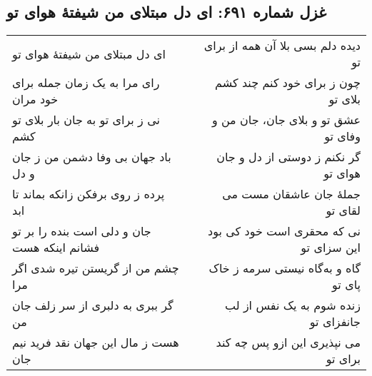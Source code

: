 \begin{center}
\section*{غزل شماره ۶۹۱: ای دل مبتلای من شیفتهٔ هوای تو}
\label{sec:691}
\begin{longtable}{l p{0.5cm} r}
ای دل مبتلای من شیفتهٔ هوای تو
&&
دیده دلم بسی بلا آن همه از برای تو
\\
رای مرا به یک زمان جمله برای خود مران
&&
چون ز برای خود کنم چند کشم بلای تو
\\
نی ز برای تو به جان بار بلای تو کشم
&&
عشق تو و بلای جان، جان من و وفای تو
\\
باد جهان بی وفا دشمن من ز جان و دل
&&
گر نکنم ز دوستی از دل و جان هوای تو
\\
پرده ز روی برفکن زانکه بماند تا ابد
&&
جملهٔ جان عاشقان مست می لقای تو
\\
جان و دلی است بنده را بر تو فشانم اینکه هست
&&
نی که محقری است خود کی بود این سزای تو
\\
چشم من از گریستن تیره شدی اگر مرا
&&
گاه و به‌گاه نیستی سرمه ز خاک پای تو
\\
گر ببری به دلبری از سر زلف جان من
&&
زنده شوم به یک نفس از لب جانفزای تو
\\
هست ز مال این جهان نقد فرید نیم جان
&&
می نپذیری این ازو پس چه کند برای تو
\\
\end{longtable}
\end{center}
